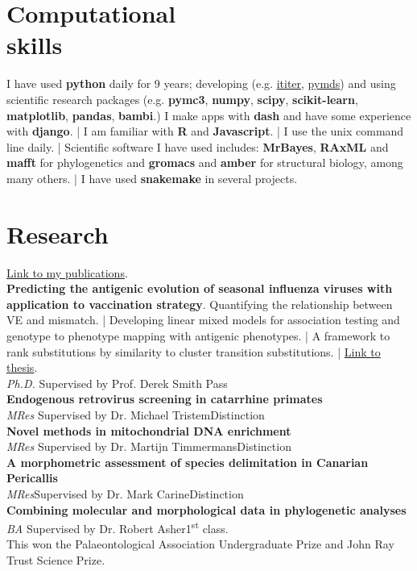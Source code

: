 \documentclass[margin]{res}
\begin{document}
\begin{resume}
	\section{Computational\\skills}

	I have used \textbf{python} daily for 9 years; developing (e.g.
	\href{https://ititer.readthedocs.io/}{ititer},
	\href{https://pymds.readthedocs.io}{pymds}) and using scientific research
	packages (e.g. \textbf{pymc3}, \textbf{numpy}, \textbf{scipy},
	\textbf{scikit-learn}, \textbf{matplotlib}, \textbf{pandas},
	\textbf{bambi}.) I make apps with \textbf{dash} and have some experience
	with \textbf{django}. | I am familiar with \textbf{R} and
	\textbf{Javascript}. | I use the unix command line daily. | Scientific
	software I have used includes: \textbf{MrBayes}, \textbf{RAxML} and
	\textbf{mafft} for phylogenetics and \textbf{gromacs} and \textbf{amber} for
	structural biology, among many others. | I have used \textbf{snakemake} in
	several projects.
	
	\section{Research}
	\href{https://scholar.google.co.uk/citations?user=q260RVcAAAAJ&hl=en}{Link to my publications}.\\
	\textbf{Predicting the antigenic evolution of seasonal influenza viruses with application to vaccination strategy}.
	Quantifying the relationship between VE and mismatch.
	|
	Developing linear mixed models for association testing and genotype to phenotype mapping with antigenic phenotypes.
	|
	A framework to rank substitutions by similarity to cluster transition substitutions.
    |
    \href{https://www.repository.cam.ac.uk/handle/1810/304119}{Link to thesis}.
    \\
	{\sl Ph.D.} \hfill Supervised by Prof. Derek Smith \hfill Pass\\
	\textbf{Endogenous retrovirus screening in catarrhine primates}\\
	{\sl MRes} \hfill Supervised by Dr. Michael Tristem\hfill Distinction\\
	\textbf{Novel methods in mitochondrial DNA enrichment}\\
	{\sl MRes} \hfill Supervised by Dr. Martijn Timmermans\hfill Distinction\\
	\textbf{A morphometric assessment of species delimitation in Canarian Pericallis}\\
	{\sl MRes}\hfill Supervised by Dr. Mark Carine\hfill Distinction\\	
	\textbf{Combining molecular and morphological data in phylogenetic analyses}\\
	{\sl BA} \hfill Supervised by Dr. Robert Asher\hfill 1\textsuperscript{st} class.\\
	This won the Palaeontological Association Undergraduate Prize and John Ray Trust Science Prize.


\end{resume}
\end{document}
